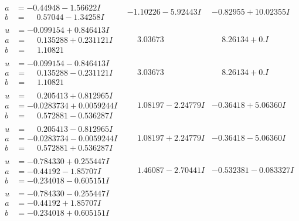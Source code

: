 \documentclass[1p]{elsarticle_modified}
\theoremstyle{definition}
\begin{document}
$$\begin{array}{c|c|c}
\begin{aligned}
a &= -0.44948 - 1.56622 I \\
b &= \phantom{-}0.57044 - 1.34258 I\end{aligned}
 & -1.10226 - 5.92443 I & -0.82955 + 10.02355 I \\ \hline\begin{aligned}
u &= -0.099154 + 0.846413 I \\
a &= \phantom{-}0.135288 + 0.231121 I \\
b &= \phantom{-}1.10821\phantom{ +0.000000I}\end{aligned}
 & \phantom{-}3.03673\phantom{ +0.000000I} & \phantom{-}8.26134 + 0. I\phantom{ +0.000000I} \\ \hline\begin{aligned}
u &= -0.099154 - 0.846413 I \\
a &= \phantom{-}0.135288 - 0.231121 I \\
b &= \phantom{-}1.10821\phantom{ +0.000000I}\end{aligned}
 & \phantom{-}3.03673\phantom{ +0.000000I} & \phantom{-}8.26134 + 0. I\phantom{ +0.000000I} \\ \hline\begin{aligned}
u &= \phantom{-}0.205413 + 0.812965 I \\
a &= -0.0283734 + 0.0059244 I \\
b &= \phantom{-}0.572881 - 0.536287 I\end{aligned}
 & \phantom{-}1.08197 - 2.24779 I & -0.36418 + 5.06360 I \\ \hline\begin{aligned}
u &= \phantom{-}0.205413 - 0.812965 I \\
a &= -0.0283734 - 0.0059244 I \\
b &= \phantom{-}0.572881 + 0.536287 I\end{aligned}
 & \phantom{-}1.08197 + 2.24779 I & -0.36418 - 5.06360 I \\ \hline\begin{aligned}
u &= -0.784330 + 0.255447 I \\
a &= -0.44192 - 1.85707 I \\
b &= -0.234018 - 0.605151 I\end{aligned}
 & \phantom{-}1.46087 - 2.70441 I & -0.532381 - 0.083327 I \\ \hline\begin{aligned}
u &= -0.784330 - 0.255447 I \\
a &= -0.44192 + 1.85707 I \\
b &= -0.234018 + 0.605151 I\end{aligned}

\end{array}$$
\end{document}
